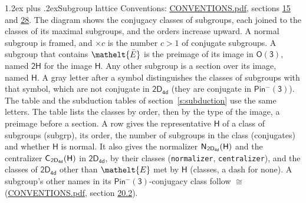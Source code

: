 \documentclass[10pt,a4paper]{article}
\makeatletter
\renewcommand\section{\@startsection{section}{1}{\z@}{-3ex plus -1ex minus -.2ex}%
  {1.2ex plus .2ex}{\normalfont\large\sffamily\bfseries\color{parttitle}}}
\numberwithin{equation}{section}
\newcommand{\eltfont}[1]{{\let\sigma\eltsigma\mathelt{#1}}}
\newcommand{\grp}[1]{\mathsf{#1}}
\newcommand{\cls}[1]{\eltfont{#1}}
\newcommand{\elt}[1]{\eltfont{#1}}
\newcommand{\samecls}{\cong}
\newcommand{\barred}[1]{\bar{#1}}
\newcommand{\hairsp}{\mkern1mu}
\makeatother
\begin{document}
\section{Subgroup lattice}\label{s:subgroups}
Conventions: \href{../../CONVENTIONS.pdf}{CONVENTIONS.pdf}, sections \href{../../../rotation/CONVENTIONS.pdf\#conv.15}{15} and \href{../../CONVENTIONS.pdf\#conv.28}{28}.
The diagram shows the conjugacy classes of subgroups, each joined to the classes of its maximal subgroups, and the orders increase upward. \label{n:index.conjugates.c}\label{n:mark.conjugates}A normal subgroup is framed, and ${\times}c$ is the number $c > 1$ of conjugate subgroups. \label{n:group.H}A subgroup that contains $\elt{\barred{E}}$ is the preimage of its image in $\grp{O(3)}$, named $\grp{2H}$ for the image $\grp{H}$. Any other subgroup is a section over its image, named $\grp{H}$. \label{n:mark.letter}A gray letter after a symbol distinguishes the classes of subgroups with that symbol, which are not conjugate in $\grp{2D_{4d}}$ (they are conjugate in \href{Pinminus3.pdf}{$\grp{Pin^{-}(3)}$}). The table and the subduction tables of section~\ref{s:subduction} use the same letters. The table lists the classes by order, then by the type of the image, a preimage before a section. \label{n:head.subgroup}\label{n:head.order}\label{n:head.conjugates}\label{n:head.normal}A row gives the representative $\grp{H}$ of a class of subgroups (subgrp), its order, the number of subgroups in the class (conjugates) and whether $\grp{H}$ is normal. \label{n:group.normalizer}\label{n:group.centralizer}\label{n:head.classes}It also gives the normalizer $\grp{N}_{\hairsp \grp{2D_{4d}}}(\grp{H})$ and the centralizer $\grp{C}_{\hairsp \grp{2D_{4d}}}(\grp{H})$ in $\grp{2D_{4d}}$, by their classes (\texttt{normalizer}, \texttt{centralizer}), and the classes of $\grp{2D_{4d}}$ other than $\cls{E}$ met by $\grp{H}$ (classes, a dash for none). A subgroup's other names in its \href{Pinminus3.pdf}{$\grp{Pin^{-}(3)}$}-conjugacy class follow $\samecls$ (\href{../../CONVENTIONS.pdf}{CONVENTIONS.pdf}, section \href{../../CONVENTIONS.pdf\#conv.20.2}{20.2}).
\end{document}
